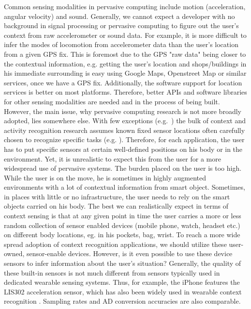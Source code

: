Common sensing modalities in pervasive computing include motion (acceleration, angular velocity) and sound. Generally, we cannot expect a developer with no background in signal processing or pervasive computing to figure out the user's context from raw accelerometer or sound data. For example, it is more difficult to infer the modes of locomotion from accelerometer data than the user's location from a given GPS fix. This is foremost due to the GPS "raw data" being closer to the contextual information, e.g. getting the user's location and shops/buildings in his immediate surrounding is easy using Google Maps, Openstreet Map or similar services, once we have a GPS fix. Additionally, the software support for location services is better on most platforms. Therefore, better APIs and software libraries for other sensing modalities are needed and in the process of being built. However, the main issue, why pervasive computing research is not more broadly adopted, lies somewhere else.
 With few exceptions (e.g.~\cite{lester2006par}) the bulk of context and activity recognition research assumes known fixed sensor locations often carefully chosen to recognize specific tasks (e.g. \cite{Ogris:2008p7906,Antifakos:2002p8030}). Therefore, for each application, the user has to put specific sensors at certain well-defined positions on his body or in the environment. Yet, it is unrealistic to expect this from the user for a more widespread use of pervasive systems. The burden placed on the user is too high. While the user is on the move, he is sometimes in highly augmented environments with a lot of contextual information from smart object. Sometimes, in places with little or no infrastructure, the user needs to rely on the smart objects carried on his body. The best we can realistically expect in terms of context sensing is that at any given point in time the user carries a more or less random collection of sensor enabled devices (mobile phone, watch, headset etc.) on different body locations, eg. in his pockets, bag, wrist. To reach a more wide spread adoption of context recognition applications, we should utilize these user-owned, sensor-enable devices. However, is it even possible to use these device sensors to infer information about the user's situation? Generally, the quality of these built-in sensors is not much different from sensors typically used in dedicated wearable sensing systems. Thus, for example, the iPhone features the LIS302 acceleration sensor, which has also been widely used in wearable context recognition \cite{Chronis:2009p7854,Krause:2006p1884,Ofstad:2008p7556,Choudhury:2010p5381}. Sampling rates and AD conversion accuracies are also comparable.
 
